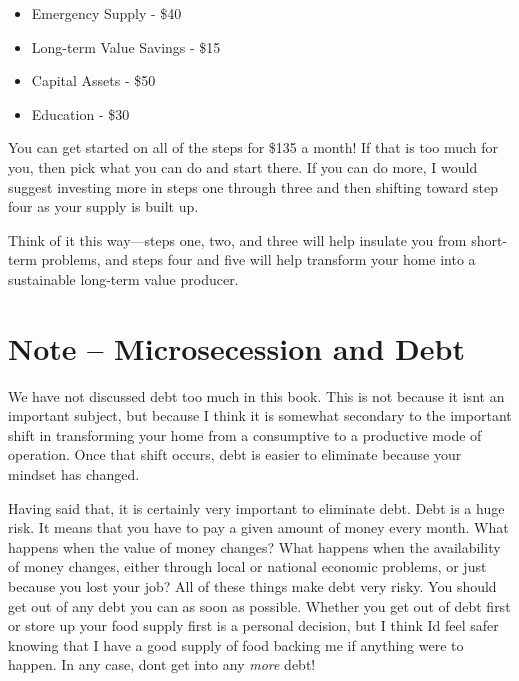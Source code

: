 \documentclass[letterpaper]{article}
\begin{document}
\begin{itemize}
\item {\color{black}
Emergency Supply - \$40}
\item {\color{black}
Long-term Value Savings - \$15}
\item {\color{black}
Capital Assets - \$50}
\item {\color{black}
Education - \$30}
\end{itemize}
{\color{black}
You can get started on all of the steps for \$135 a
month\textcolor[rgb]{0.32941177,0.5529412,0.83137256}{! }If that is too
much for you, then pick what you can do and start there. If you can do
more, I would suggest investing more in steps one through three and
then shifting toward step four as your supply is built up.}

{\color{black}
Think of it this way—steps one, two, and three will help insulate you
from short-term problems, and steps four and five will help transform
your home into a sustainable long-term value producer.}

\section[Note – Microsecession and Debt]{Note – Microsecession and Debt}
{\color{black}
We have not discussed debt too much in this book. This is not because it
isn{\textquotesingle}t an important subject, but because I think it is
somewhat secondary to the important shift in transforming your home
from a consumptive to a productive mode of operation. Once that shift
occurs, debt is easier to eliminate because your mindset has changed. }

{\color{black}
Having said that, it is certainly very important to eliminate debt. Debt
is a huge risk. It means that you have to pay a given amount of money
every month. What happens when the value of money changes?  What
happens when the availability of money changes, either through local or
national economic problems, or just because you lost your job?  All of
these things make debt very risky. You should get out of any debt you
can as soon as possible. Whether you get out of debt first or store up
your food supply first is a personal decision, but I think
I{\textquotesingle}d feel safer knowing that I have a good supply of
food backing me if anything were to happen. In any case,
don{\textquotesingle}t get into any \textit{more} debt!}
\end{document}
